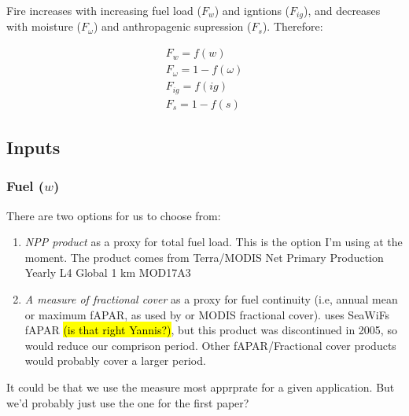 Fire increases with increasing fuel load ($F_w$) and igntions ($F_{ig}$), and decreases with moisture ($F_{\omega}$) and anthropagenic supression ($F_s$). Therefore:

\begin{equation}
    \begin{split}
        F_{w} = f(w) \\
        F_{\omega} = 1 - f(\omega) \\
        F_{ig} = f(ig) \\
        F_{s} = 1- f(s)
    \end{split}
    \label{equ:LimFIRE.x}
\end{equation}



\subsection{Inputs}
\begin{shaded}
\subsubsection{Fuel ($w$)}
There are two options for us to choose from:
\begin{enumerate}
    \item \textit{NPP product} as a proxy for total fuel load. This is the option I'm using at the moment. The product comes from Terra/MODIS Net Primary Production Yearly L4 Global 1 km MOD17A3 \citep{nasa2012terra}
    \item \textit{A measure of fractional cover} as a proxy for fuel continuity (i.e, annual mean or maximum fAPAR, as used by \citet{knorr2014impact,knorr2016climate} or MODIS fractional cover). \citet{bistinas2014causal} uses SeaWiFs fAPAR \hl{(is that right Yannis?)}, but this product was discontinued in 2005, so would reduce our comprison period. Other fAPAR/Fractional cover products would probably cover a larger period.
\end{enumerate}

It could be that we use the measure most apprprate for a given application. But we'd probably just use the one for the first paper?
\end{shaded}

